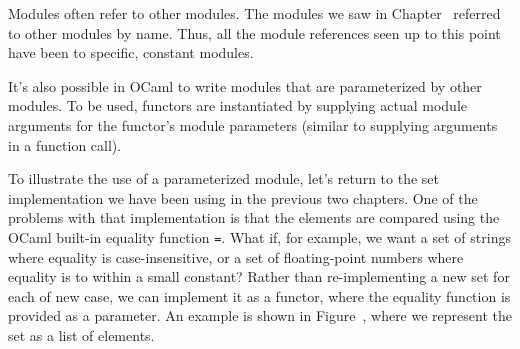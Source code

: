 %
%
%


Modules often refer to other modules. The modules we saw in
Chapter~ referred to other modules by
name. Thus, all the module references  seen up to this point have
been to specific, constant modules.

  It's also possible in OCaml to write modules
that are parameterized by other modules.  To be used, functors are instantiated by supplying actual
module arguments for the functor's module parameters (similar to supplying arguments in a function
call).

To illustrate the use of a parameterized module, let's return to the
set implementation we have been using in the previous two
chapters. One of the problems with that implementation is that the
elements are compared using the OCaml built-in equality
function \hbox{\lstinline/=/}.  What if, for example, we want a set of
strings where equality is case-insensitive, or a set of floating-point
numbers where equality is to within a small constant?  Rather than
re-implementing a new set for each of new case, we can implement it as
a functor, where the equality function is provided as a parameter.  An
example is shown in Figure~, where we represent the
set as a list of elements.

